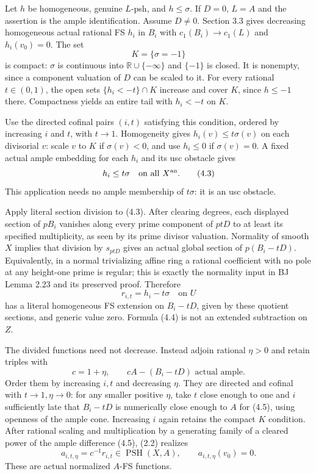 \documentclass[
  10pt,
]{article}
\begin{document}
Let \(h\) be homogeneous, genuine \(L\)-psh, and \(h\leq\sigma\). If
\(D=0\), \(L=A\) and the assertion is the ample identification. Assume
\(D\ne0\). Section 3.3 gives decreasing homogeneous actual rational FS
\(h_i\) in \(B_i\) with \(c_1(B_i)\to c_1(L)\) and \(h_i(v_0)=0\). The
set \[K=\{\sigma=-1\}\tag{4.2}\] is compact: \(\sigma\) is continuous
into \(\mathbb R\cup\{-\infty\}\) and \(\{-1\}\) is closed. It is
nonempty, since a component valuation of \(D\) can be scaled to it. For
every rational \(t\in(0,1)\), the open sets \(\{h_i<-t\}\cap K\)
increase and cover \(K\), since \(h\leq-1\) there. Compactness yields an
entire tail with \(h_i<-t\) on \(K\).

Use the directed cofinal pairs \((i,t)\) satisfying this condition,
ordered by increasing \(i\) and \(t\), with \(t\to1\). Homogeneity gives
\(h_i(v)\leq t\sigma(v)\) on each divisorial \(v\): scale \(v\) to \(K\)
if \(\sigma(v)<0\), and use \(h_i\leq0\) if \(\sigma(v)=0\). A fixed
actual ample embedding for each \(h_i\) and its usc obstacle gives
\[h_i\leq t\sigma\quad\text{on all }X^{\rm an}.\tag{4.3}\] This
application needs no ample membership of \(t\sigma\): it is an usc
obstacle.

Apply literal section division to (4.3). After clearing degrees, each
displayed section of \(pB_i\) vanishes along every prime component of
\(ptD\) to at least its specified multiplicity, as seen by its prime
divisor valuation. Normality of smooth \(X\) implies that division by
\(s_{ptD}\) gives an actual global section of \(p(B_i-tD)\).
Equivalently, in a normal trivializing affine ring a rational
coefficient with no pole at any height-one prime is regular; this is
exactly the normality input in BJ Lemma 2.23 and its preserved proof.
Therefore \[r_{i,t}=h_i-t\sigma\quad\text{on }U\tag{4.4}\] has a literal
homogeneous FS extension on \(B_i-tD\), given by these quotient
sections, and generic value zero. Formula (4.4) is not an extended
subtraction on \(Z\).

The divided functions need not decrease. Instead adjoin rational
\(\eta>0\) and retain triples with
\[c=1+\eta,\qquad cA-(B_i-tD)\text{ actual ample}.\tag{4.5}\] Order them
by increasing \(i,t\) and decreasing \(\eta\). They are directed and
cofinal with \(t\to1,\eta\to0\): for any smaller positive \(\eta\), take
\(t\) close enough to one and \(i\) sufficiently late that \(B_i-tD\) is
numerically close enough to \(A\) for (4.5), using openness of the ample
cone. Increasing \(i\) again retains the compact \(K\) condition. After
rational scaling and multiplication by a generating family of a cleared
power of the ample difference (4.5), (2.2) realizes
\[a_{i,t,\eta}=c^{-1}r_{i,t}\in\operatorname{PSH}(X,A),\qquad a_{i,t,\eta}(v_0)=0.\tag{4.6}\]
These are actual normalized \(A\)-FS functions.
\end{document}
